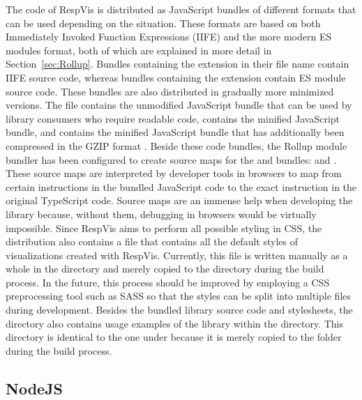 The code of RespVis is distributed as JavaScript bundles of different formats that can be used depending on the situation.
These formats are based on both Immediately Invoked Function Expressions (IIFE) and the more modern ES modules format, both of which are explained in more detail in Section~\ref{sec:Rollup}.
Bundles containing the  extension in their file name contain IIFE source code, whereas bundles containing the  extension contain ES module source code.  
These bundles are also distributed in gradually more minimized versions.
The  file contains the unmodified JavaScript bundle that can be used by library consumers who require readable code,  contains the minified JavaScript bundle, and  contains the minified JavaScript bundle that has additionally been compressed in the GZIP format \parencite{GZIP}.
Beside these code bundles, the Rollup module bundler has been configured to create source maps for the  and  bundles:  and .
These source maps are interpreted by developer tools in browsers to map from certain instructions in the bundled JavaScript code to the exact instruction in the original TypeScript code.
Source maps are an immense help when developing the library because, without them, debugging in browsers would be virtually impossible.
Since RespVis aims to perform all possible styling in CSS, the distribution also contains a  file that contains all the default styles of visualizations created with RespVis. 
Currently, this file is written manually as a whole in the  directory and merely copied to the  directory during the build process.
In the future, this process should be improved by employing a CSS preprocessing tool such as SASS \parencite{SASS} so that the styles can be split into multiple files during development.
Besides the bundled library source code and stylesheets, the  directory also contains usage examples of the library within the  directory.
This directory is identical to the one under  because it is merely copied to the  folder during the build process.


\subsection{NodeJS}

